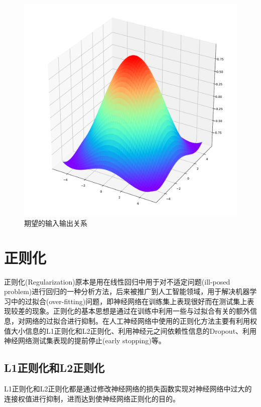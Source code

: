 \documentclass[a4paper]{ctexart}
\begin{document}
\begin{spacing}{1.3}
\begin{figure}[htbp]
		\begin{minipage}[t]{0.5\textwidth}
			\centering
			\includegraphics[width=\textwidth]{figure//target.pdf}
			\caption{期望的输入输出关系}\label{pic:期望关系图}
		\end{minipage}
	\end{figure}
	
	\section{正则化}
	正则化(Regularization)原本是用在线性回归中用于对不适定问题(ill-posed problem)进行回归的一种分析方法，后来被推广到人工智能领域，用于解决机器学习中的过拟合(over-fitting)问题\cite{RN132}，即神经网络在训练集上表现很好而在测试集上表现较差的现象。正则化的基本思想是通过在训练中利用一些与过拟合有关的额外信息，对网络的过拟合进行抑制。在人工神经网络中使用的正则化方法主要有利用权值大小信息的L1正则化\cite{RN135}和L2正则化\cite{RN79}、利用神经元之间依赖性信息的Dropout\cite{RN133}、利用神经网络测试集表现的提前停止(early stopping)\cite{RN134}等。
	\subsection{L1正则化和L2正则化}
	L1正则化和L2正则化都是通过修改神经网络的损失函数实现对神经网络中过大的连接权值进行抑制，进而达到使神经网络正则化的目的。
	

\end{spacing}
\end{document}
